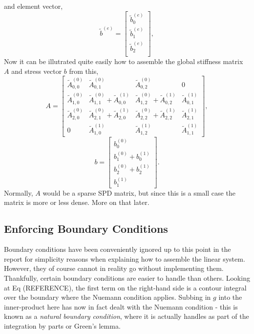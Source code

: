 and element vector,
\begin{equation}
	\tilde{b}^{(e)} =
	\left[\begin{matrix}
		\tilde{b}^{(e)}_0 \\
		\tilde{b}^{(e)}_1 \\
		\tilde{b}^{(e)}_2 \\
	\end{matrix}\right],
\end{equation}
Now it can be illutrated quite easily how to assemble the global stiffness matrix $A$ and stress vector $b$ from this,
\begin{equation}
	A =
	\left[\begin{matrix} 
		\tilde{A}^{(0)}_{0,0} & \tilde{A}^{(0)}_{0,1} & \tilde{A}^{(0)}_{0,2} & 0 \\
		\tilde{A}^{(0)}_{1,0} & \tilde{A}^{(0)}_{1,1} + \tilde{A}^{(1)}_{0,0}  & \tilde{A}^{(0)}_{1,2} + \tilde{A}^{(1)}_{0,2} & \tilde{A}^{(1)}_{0,1} \\
		\tilde{A}^{(0)}_{2,0} & \tilde{A}^{(0)}_{2,1} + \tilde{A}^{(1)}_{2,0} & \tilde{A}^{(0)}_{2,2} + \tilde{A}^{(1)}_{2,2} & \tilde{A}^{(1)}_{2,1} \\
		0 & \tilde{A}^{(1)}_{1,0} & \tilde{A}^{(1)}_{1,2} & \tilde{A}^{(1)}_{1,1}
	\end{matrix}\right],
\end{equation}
\begin{equation}
	b =
	\left[\begin{matrix}
		b^{(0)}_0 \\
		b^{(0)}_1 + b^{(1)}_0 \\
		b^{(0)}_2 + b^{(1)}_2 \\
		b^{(1)}_1
	\end{matrix}\right].
\end{equation}
Normally, $A$ would be a sparse SPD matrix, but since this is a small case the matrix is more or less dense. More on that later.

\subsection{Enforcing Boundary Conditions}

Boundary conditions have been conveniently ignored up to this point in the report for simplicity reasons when explaining how to assemble the linear system. However, they of course cannot in reality go without implementing them. Thankfully, certain boundary conditions are easier to handle than others. Looking at Eq (REFERENCE), the first term on the right-hand side is a contour integral over the boundary where the Nuemann condition applies. Subbing in $g$ into the inner-product here has now in fact dealt with the Nuemann condition - this is known as a \textit{natural boundary condition}, where it is actually handles as part of the integration by parts or Green's lemma.

